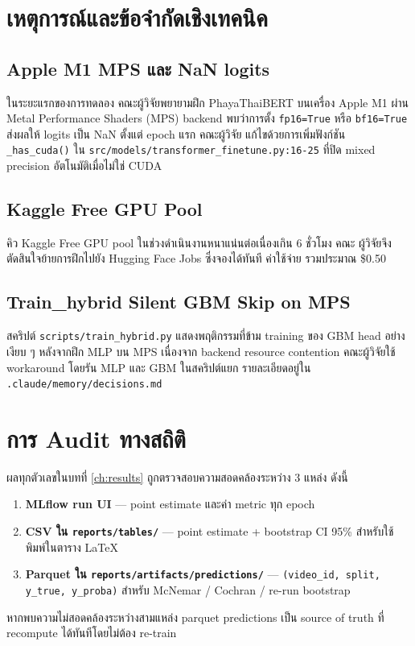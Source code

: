 \section{เหตุการณ์และข้อจำกัดเชิงเทคนิค}

\subsection{Apple M1 MPS และ NaN logits}
ในระยะแรกของการทดลอง คณะผู้วิจัยพยายามฝึก PhayaThaiBERT บนเครื่อง Apple M1
ผ่าน Metal Performance Shaders (MPS) backend พบว่าการตั้ง \texttt{fp16=True}
หรือ \texttt{bf16=True} ส่งผลให้ logits เป็น NaN ตั้งแต่ epoch แรก คณะผู้วิจัย
แก้ไขด้วยการเพิ่มฟังก์ชัน \texttt{\_has\_cuda()} ใน
\texttt{src/models/transformer\_finetune.py:16-25} ที่ปิด mixed precision
อัตโนมัติเมื่อไม่ใช่ CUDA

\subsection{Kaggle Free GPU Pool}
คิว Kaggle Free GPU pool ในช่วงดำเนินงานหนาแน่นต่อเนื่องเกิน 6 ชั่วโมง คณะ
ผู้วิจัยจึงตัดสินใจย้ายการฝึกไปยัง Hugging Face Jobs ซึ่งจองได้ทันที ค่าใช้จ่าย
รวมประมาณ \$0.50

\subsection{Train\_hybrid Silent GBM Skip on MPS}
สคริปต์ \texttt{scripts/train\_hybrid.py} แสดงพฤติกรรมที่ข้าม training ของ
GBM head อย่างเงียบ ๆ หลังจากฝึก MLP บน MPS เนื่องจาก backend resource
contention คณะผู้วิจัยใช้ workaround โดยรัน MLP และ GBM ในสคริปต์แยก
รายละเอียดอยู่ใน \texttt{.claude/memory/decisions.md}

\section{การ Audit ทางสถิติ}

ผลทุกตัวเลขในบทที่ \ref{ch:results} ถูกตรวจสอบความสอดคล้องระหว่าง 3 แหล่ง
ดังนี้

\begin{enumerate}[leftmargin=2em]
  \item \textbf{MLflow run UI} — point estimate และค่า metric ทุก epoch
  \item \textbf{CSV ใน \texttt{reports/tables/}} — point estimate + bootstrap
        CI 95\% สำหรับใช้พิมพ์ในตาราง LaTeX
  \item \textbf{Parquet ใน \texttt{reports/artifacts/predictions/}} —
        \texttt{(video\_id, split, y\_true, y\_proba)} สำหรับ McNemar /
        Cochran / re-run bootstrap
\end{enumerate}

หากพบความไม่สอดคล้องระหว่างสามแหล่ง parquet predictions เป็น source of
truth ที่ recompute ได้ทันทีโดยไม่ต้อง re-train
